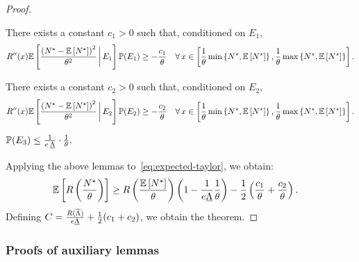 \documentclass[12pt]{article}
\begin{document}
\begin{proof}
\begin{lemma}\label{lem:e1-analysis}
There exists a constant $c_1 > 0$ such that, conditioned on $E_1$, $$R''(x) \mathbb{E}\left[\frac{\left({N}^\star-\mathbb{E}\left[{N}^\star\right]\right)^2}{\theta^2}\,\bigg{|}\,E_1\right]\mathbb{P}(E_1) \geq -\frac{c_1}{\theta} \quad \forall \, x\in \left[\frac1\theta\min\left\{{N}^\star,{\mathbb{E}\left[{N}^\star\right]}\right\},\frac1\theta\max\left\{{{N}^\star},{\mathbb{E}\left[{N}^\star\right]}\right\}\right].$$
\end{lemma}



\begin{lemma}\label{lem:e2-analysis}
There exists a constant $c_2 > 0$ such that, conditioned on $E_2$, $$R''(x) \mathbb{E}\left[\frac{\left({N}^\star-\mathbb{E}\left[{N}^\star\right]\right)^2}{\theta^2}\,\bigg{|}\,E_2\right]\mathbb{P}(E_2) \geq -\frac{c_2}{\theta} \quad \forall \, x\in \left[\frac1\theta\min\left\{{N}^\star,{\mathbb{E}\left[{N}^\star\right]}\right\},\frac1\theta\max\left\{{{N}^\star},{\mathbb{E}\left[{N}^\star\right]}\right\}\right].$$
\end{lemma}



\begin{lemma}\label{lem:prob-e3}
$\mathbb{P}(E_3) \leq \frac{1}{e\,\underline{\Lambda}}\cdot\frac1\theta.$
\end{lemma}



Applying the above lemmas to~\eqref{eq:expected-taylor}, we obtain:
\begin{align*}
    \mathbb{E}\left[R\left(\frac{{N}^\star}{\theta}\right)\right] &\geq R\left(\frac{\mathbb{E}\left[{N}^\star\right]}{\theta}\right)\left(1-\frac{1}{e\underline{\Lambda}}\frac{1}{\theta}\right) - \frac12\left(\frac{c_1}{\theta} + \frac{c_2}{\theta}\right).
\end{align*}
Defining $C = \frac{R(\overline{\Lambda})}{e\underline{\Lambda}} + \frac12({c_1+c_2})$, we obtain the theorem.
\end{proof}



\subsubsection{Proofs of auxiliary lemmas}\label{app:asymp-thm-lemmas}
\end{document}

